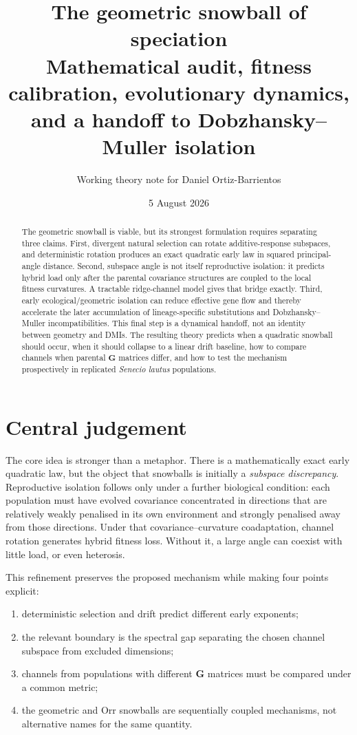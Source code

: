 \documentclass[11pt,a4paper]{article}
\title{The geometric snowball of speciation\\\large Mathematical audit, fitness calibration, evolutionary dynamics, and a handoff to Dobzhansky--Muller isolation}
\author{Working theory note for Daniel Ortiz-Barrientos}
\date{5 August 2026}
\newcommand{\G}{\mathbf G}
\begin{document}
\maketitle

\begin{abstract}
The geometric snowball is viable, but its strongest formulation requires separating three claims. First, divergent natural selection can rotate additive-response subspaces, and deterministic rotation produces an exact quadratic early law in squared principal-angle distance. Second, subspace angle is not itself reproductive isolation: it predicts hybrid load only after the parental covariance structures are coupled to the local fitness curvatures. A tractable ridge-channel model gives that bridge exactly. Third, early ecological/geometric isolation can reduce effective gene flow and thereby accelerate the later accumulation of lineage-specific substitutions and Dobzhansky--Muller incompatibilities. This final step is a dynamical handoff, not an identity between geometry and DMIs. The resulting theory predicts when a quadratic snowball should occur, when it should collapse to a linear drift baseline, how to compare channels when parental \(\G\) matrices differ, and how to test the mechanism prospectively in replicated \textit{Senecio lautus} populations.
\end{abstract}

\section{Central judgement}

The core idea is stronger than a metaphor. There is a mathematically exact early quadratic law, but the object that snowballs is initially a \emph{subspace discrepancy}. Reproductive isolation follows only under a further biological condition: each population must have evolved covariance concentrated in directions that are relatively weakly penalised in its own environment and strongly penalised away from those directions. Under that covariance--curvature coadaptation, channel rotation generates hybrid fitness loss. Without it, a large angle can coexist with little load, or even heterosis.

This refinement preserves the proposed mechanism while making four points explicit:
\begin{enumerate}[leftmargin=1.5em]
\item deterministic selection and drift predict different early exponents;
\item the relevant boundary is the spectral gap separating the chosen channel subspace from excluded dimensions;
\item channels from populations with different \(\G\) matrices must be compared under a common metric;
\item the geometric and Orr snowballs are sequentially coupled mechanisms, not alternative names for the same quantity.
\end{enumerate}
\end{document}
